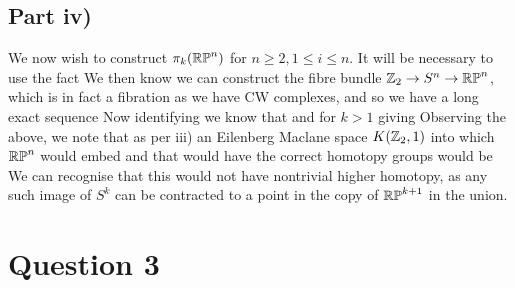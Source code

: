 \documentclass{article}
\begin{document}
\subsection{Part iv)}
We now wish to construct $\pi_k(\mathbb{RP}^n)$ for $n \geq 2, 1 \leq i \leq n$. It will be necessary to use the fact 
We then know we can construct the fibre bundle $\mathbb{Z}_2 \to S^n \to \mathbb{RP}^n$, which is in fact a fibration as we have CW complexes, and so we have a long exact sequence 
Now identifying 
we know that
and 
for $k > 1$ giving 
Observing the above, we note that as per iii) an Eilenberg Maclane space $K(\mathbb{Z}_2,1)$ into which $\mathbb{RP}^n$ would embed and that would have the correct homotopy groups would be 
We can recognise that this would not have nontrivial higher homotopy, as any such image of $S^k$ can be contracted to a point in the copy of $\mathbb{RP}^{k+1}$ in the union. 
\section{Question 3}
\end{document}
